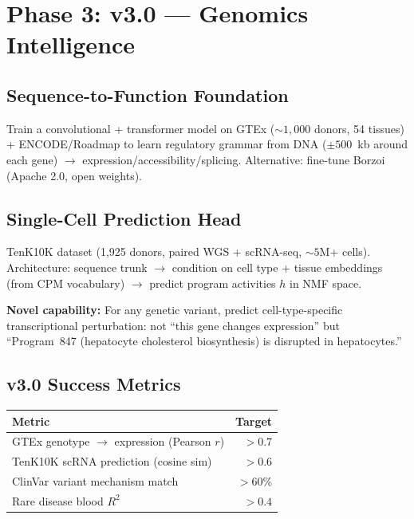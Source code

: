 \documentclass[10pt,twocolumn,letterpaper]{article}
\begin{document}
\section{Phase 3: v3.0 --- Genomics Intelligence}

\subsection{Sequence-to-Function Foundation}

Train a convolutional + transformer model on GTEx (${\sim}1{,}000$ donors,
54 tissues) + ENCODE/Roadmap to learn regulatory grammar from DNA
($\pm500$~kb around each gene) $\to$ expression/accessibility/splicing.
Alternative: fine-tune Borzoi (Apache 2.0, open weights).

\subsection{Single-Cell Prediction Head}

TenK10K dataset (1,925 donors, paired WGS + scRNA-seq, ${\sim}5$M+ cells).
Architecture: sequence trunk $\to$ condition on cell type + tissue embeddings
(from CPM vocabulary) $\to$ predict program activities $h$ in NMF space.

\textbf{Novel capability:} For any genetic variant, predict cell-type-specific
transcriptional perturbation: not ``this gene changes expression'' but
``Program~847 (hepatocyte cholesterol biosynthesis) is disrupted in
hepatocytes.''

\subsection{v3.0 Success Metrics}

\begin{table}[h]
\centering\small
\begin{tabular}{@{}lr@{}}
\toprule
Metric & Target \\
\midrule
GTEx genotype $\to$ expression (Pearson $r$) & ${>}0.7$ \\
TenK10K scRNA prediction (cosine sim) & ${>}0.6$ \\
ClinVar variant mechanism match & ${>}60\%$ \\
Rare disease blood $R^2$ & ${>}0.4$ \\
\bottomrule
\end{tabular}
\end{table}
\end{document}
